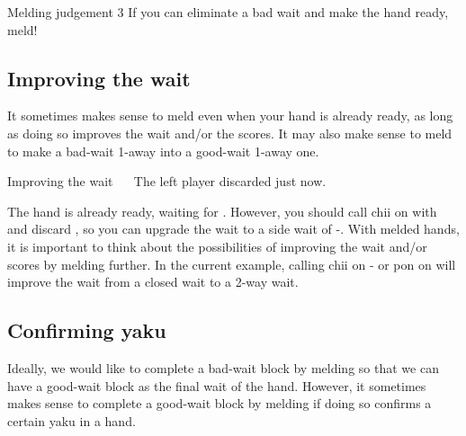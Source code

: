 \color{MyRed}
\begin{itembox}[c]{Melding judgement 3}\normalcolor
If you can eliminate a bad wait and make the hand ready, meld!
\end{itembox}\normalcolor

\subsection{Improving the wait}
It sometimes makes sense to meld even when your hand is already ready, as long as doing so improves the wait and/or the scores. It may also make sense to meld to make a bad-wait 1-away into a good-wait 1-away one. 

\bigskip
\begin{itembox}[r]{Improving the wait}
\bp
{}\rfw{}\rfd{}~~\zhong\zhong\rzhong
\ep
\vspace{-10pt}The left player discarded {\LARGE{}} just now.
\end{itembox}
\noindent
The hand is already ready, waiting for {\LARGE{}}. However, you should call {\jap chii} on {\LARGE{}} with {\LARGE{}} and discard {\LARGE{}}, so you can upgrade the wait to a side wait of {\LARGE{}-}. 
With melded hands, it is important to think about the possibilities of improving the wait and/or scores by melding further. 
In the current example, calling {\jap chii} on {\LARGE{}-} or {\jap pon} on {\LARGE{}} will improve the wait from a closed wait to a 2-way wait. 

\bigskip
\subsection{Confirming {\jap yaku}}
Ideally, we would like to complete a bad-wait block by melding so that we can have a good-wait block as the final wait of the hand. However, it sometimes makes sense to complete a good-wait block by melding if doing so confirms a certain {\jap yaku} in a hand. 

